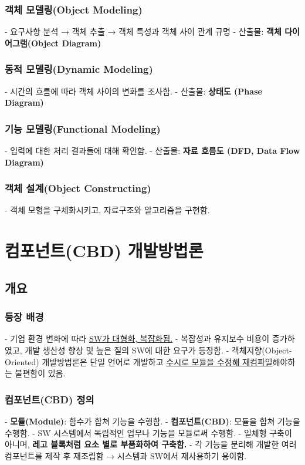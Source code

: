 \documentclass[a4paper,12pt]{article}
\begin{document}
\subsubsection{객체 모델링(Object Modeling)}
- 요구사항 분석 → 객체 추출 → 객체 특성과 객체 사이 관계 규명
\newline
- 산출물: \textbf{객체 다이어그램(Object Diagram)}

\subsubsection{동적 모델링(Dynamic Modeling)}
- 시간의 흐름에 따라 객체 사이의 변화를 조사함.
\newline
- 산출물: \textbf{상태도 (Phase Diagram)}

\subsubsection{기능 모델링(Functional Modeling)}
- 입력에 대한 처리 결과들에 대해 확인함.
\newline
- 산출물: \textbf{자료 흐름도 (DFD, Data Flow Diagram)}

\subsubsection{객체 설계(Object Constructing)}
- 객체 모형을 구체화시키고, 자료구조와 알고리즘을 구현함.

\newpage
\section{컴포넌트(CBD) 개발방법론}

\subsection{개요}
\subsubsection{등장 배경}
- 기업 환경 변화에 따라 \underline{SW가 대형화, 복잡화됨.}
\newline
- 복잡성과 유지보수 비용이 증가하였고, 개발 생산성 향상 및 높은 질의 SW에 대한 요구가 등장함.
\newline
- 객체지향(Object-Oriented) 개발방법론은 단일 언어로 개발하고 \underline{수시로 모듈을 수정해 재컴파일}해야하는 불편함이 있음.

\subsubsection{컴포넌트(CBD) 정의}
- \textbf{모듈(Module)}: 함수가 합쳐 기능을 수행함.
\newline
- \textbf{컴포넌트(CBD)}: 모듈을 합쳐 기능을 수행함.
\newline
- SW 시스템에서 독립적인 업무나 기능을 모듈로써 수행함.
\newline
- 일체형 구축이 아니며, \textbf{레고 블록처럼 요소 별로 부품화하여 구축함.}
\newline
- 각 기능을 분리해 개발한 여러 컴포넌트를 제작 후 재조립함 → 시스템과 SW에서 재사용하기 용이함.
\newline
\end{document}
